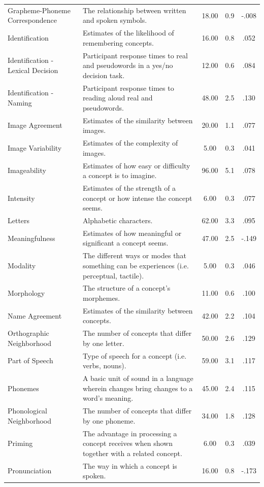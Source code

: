 \documentclass[english,man]{apa6}
\theoremstyle{definition}
\theoremstyle{definition}
\theoremstyle{definition}
\theoremstyle{remark}
\begin{document}
\begin{table}[tbp]
\begin{center}
\begin{threeparttable}
\begin{tabular}{llccc}
Grapheme-Phoneme Correspondence & The relationship between written and spoken symbols. & 18.00 & 0.9 & -.008\\
Identification & Estimates of the likelihood of remembering concepts. & 16.00 & 0.8 & .052\\
Identification - Lexical Decision & Participant response times to real and pseudowords in a yes/no decision task. & 12.00 & 0.6 & .084\\
Identification - Naming & Participant response times to reading aloud real and pseudowords. & 48.00 & 2.5 & .130\\
Image Agreement & Estimates of the similarity between images. & 20.00 & 1.1 & .077\\
Image Variability & Estimates of the complexity of images. & 5.00 & 0.3 & .041\\
Imageability & Estimates of how easy or difficulty a concept is to imagine. & 96.00 & 5.1 & .078\\
Intensity & Estimates of the strength of a concept or how intense the concept seems. & 6.00 & 0.3 & .077\\
Letters & Alphabetic characters. & 62.00 & 3.3 & .095\\
Meaningfulness & Estimates of how meaningful or significant a concept seems. & 47.00 & 2.5 & -.149\\
Modality & The different ways or modes that something can be experiences (i.e. perceptual, tactile). & 5.00 & 0.3 & .046\\
Morphology & The structure of a concept’s morphemes. & 11.00 & 0.6 & .100\\
Name Agreement & Estimates of the similarity between concepts. & 42.00 & 2.2 & .104\\
Orthographic Neighborhood & The number of concepts that differ by one letter. & 50.00 & 2.6 & .129\\
Part of Speech & Type of speech for a concept (i.e. verbs, nouns). & 59.00 & 3.1 & .117\\
Phonemes & A basic unit of sound in a language wherein changes bring changes to a word’s meaning. & 45.00 & 2.4 & .115\\
Phonological Neighborhood & The number of concepts that differ by one phoneme. & 34.00 & 1.8 & .128\\
Priming & The advantage in processing a concept receives when shown together with a related concept. & 6.00 & 0.3 & .039\\
Pronunciation & The way in which a concept is spoken. & 16.00 & 0.8 & -.173\\

\end{tabular}
\end{threeparttable}
\end{center}
\end{table}
\end{document}
